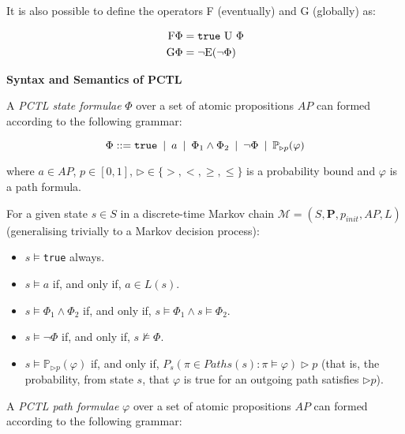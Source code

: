 {\begin{defi}
{It is also possible to define the operators F (eventually) and G (globally) as:

\begin{equation}
\begin{aligned}
	\text{F} \Phi & = \text{\texttt{true}} \text{ U } \Phi \\
	\text{G} \Phi & = \neg \text{E} (\neg \Phi)
\end{aligned}
\end{equation}

}
\end{defi}}

{\begin{defi}
{\setlength{\parskip}{2em}
\textbf{Syntax and Semantics of PCTL}\vspace{1em}\\}
{\setlength{\parskip}{1em} 
A \textit{PCTL state formulae} $\Phi$ over a set of atomic propositions $AP$ can formed according to the following grammar:

\begin{equation}
	\Phi ::= \text{\texttt{true}} \:\mid\: a \:\mid\: \Phi_1 \wedge \Phi_2 \:\mid\: \neg \Phi \:\mid\: \mathbb{P}_{\triangleright p} (\varphi)
\end{equation}

where $a \in AP$, $p \in [0,1]$, $\triangleright \in \{>, <, \geq, \leq\}$ is a probability bound and $\varphi$ is a path formula.

For a given state $s \in S$ in a discrete-time Markov chain $\mathcal{M} = (S, \mathbf{P}, p_{init}, AP, L)$ (generalising trivially to a Markov decision process):
\begin{itemize}
	\item $s \models $\texttt{true} always.
	\item $s \models a$ if, and only if, $a \in L(s)$.
	\item $s \models \Phi_1 \wedge \Phi_2$ if, and only if, $s \models \Phi_1 \wedge s \models \Phi_2$.
	\item $s \models \neg \Phi$ if, and only if, $s \not\models \Phi$.
	\item $s \models \mathbb{P}_{\triangleright p} (\varphi)$ if, and only if, $P_s (\pi \in Paths(s): \pi \models \varphi) \triangleright p$ (that is, the probability, from state $s$, that $\varphi$ is true for an outgoing path satisfies $\triangleright p$).
\end{itemize}

A \textit{PCTL path formulae} $\varphi$ over a set of atomic propositions $AP$ can formed according to the following grammar:

}
\end{defi}}
